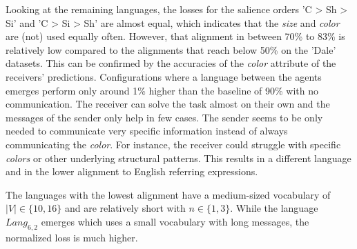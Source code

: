 Looking at the remaining languages, the losses for the salience orders 'C > Sh > Si' and 'C > Si > Sh' are almost equal, which indicates that the \emph{size} and \emph{color} are (not) used equally often.
However, that alignment in between 70\% to 83\% is relatively low compared to the alignments that reach below 50\% on the 'Dale' datasets.
This can be confirmed by the accuracies of the \emph{color} attribute of the receivers' predictions.
Configurations where a language between the agents emerges perform only around 1\% higher than the baseline of 90\% with no communication.
The receiver can solve the task almost on their own and the messages of the sender only help in few cases.
The sender seems to be only needed to communicate very specific information instead of always communicating the \emph{color}.
For instance, the receiver could struggle with specific \emph{colors} or other underlying structural patterns.
This results in a different language and in the lower alignment to English referring expressions.

The languages with the lowest alignment have a medium-sized vocabulary of $|V| \in \{10,16\}$ and are relatively short with $n \in \{1,3\}$.
While the language $Lang_{6,2}$ emerges which uses a small vocabulary with long messages, the normalized loss is much higher.